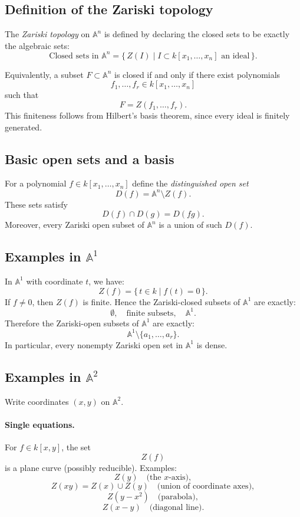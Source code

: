\documentclass[12pt,a4paper]{article}
\theoremstyle{plain}
\theoremstyle{definition}      %
\begin{document}
\subsection*{Definition of the Zariski topology}

The \emph{Zariski topology} on $\mathbb A^n$ is defined by declaring the closed sets to be exactly the algebraic sets:
\[
\text{Closed sets in } \mathbb A^n
=
\{\,Z(I)\mid I\subset k[x_1,\dots,x_n] \text{ an ideal}\,\}.
\]

Equivalently, a subset $F\subset \mathbb A^n$ is closed if and only if there exist polynomials
\[
f_1,\dots,f_r\in k[x_1,\dots,x_n]
\]
such that
\[
F
=
Z(f_1,\dots,f_r).
\]
This finiteness follows from Hilbert's basis theorem, since every ideal is finitely generated.

\subsection*{Basic open sets and a basis}

For a polynomial $f\in k[x_1,\dots,x_n]$ define the \emph{distinguished open set}
\[
D(f)
=
\mathbb A^n\setminus Z(f).
\]
These sets satisfy
\[
D(f)\cap D(g)
=
D(fg).
\]
Moreover, every Zariski open subset of $\mathbb A^n$ is a union of such $D(f)$.

\subsection*{Examples in $\mathbb A^1$}

In $\mathbb A^1$ with coordinate $t$, we have:
\[
Z(f)
=
\{\,t\in k \mid f(t)=0\,\}.
\]
If $f\neq 0$, then $Z(f)$ is finite.
Hence the Zariski-closed subsets of $\mathbb A^1$ are exactly:
\[
\emptyset,
\quad
\text{finite subsets},
\quad
\mathbb A^1.
\]
Therefore the Zariski-open subsets of $\mathbb A^1$ are exactly:
\[
\mathbb A^1\setminus \{a_1,\dots,a_r\}.
\]
In particular, every nonempty Zariski open set in $\mathbb A^1$ is dense.

\subsection*{Examples in $\mathbb A^2$}

Write coordinates $(x,y)$ on $\mathbb A^2$.

\paragraph{Single equations.}
For $f\in k[x,y]$, the set
\[
Z(f)
\]
is a plane curve (possibly reducible).
Examples:
\[
Z(y)
\quad
\text{(the $x$-axis)},
\]
\[
Z(xy)
=
Z(x)\cup Z(y)
\quad
\text{(union of coordinate axes)},
\]
\[
Z(y-x^2)
\quad
\text{(parabola)},
\]
\[
Z(x-y)
\quad
\text{(diagonal line)}.
\]
\end{document}
